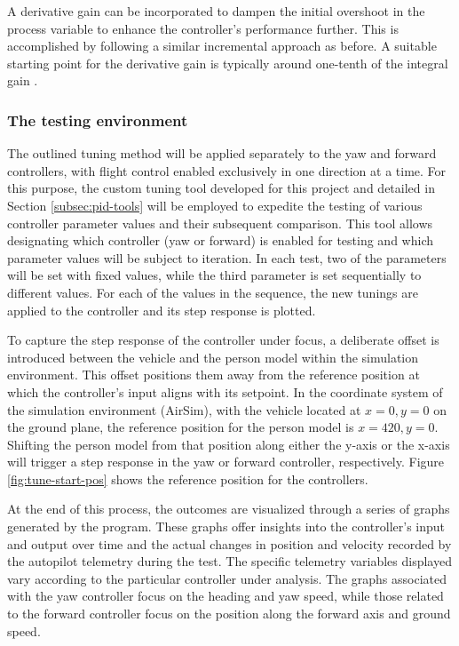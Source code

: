 A derivative gain can be incorporated to dampen the initial overshoot in the process variable to enhance the controller's performance further. This is accomplished by following a similar incremental approach as before. A suitable starting point for the derivative gain is typically around one-tenth of the integral gain \cite{pid-tuning}.


\subsubsection{The testing environment}

The outlined tuning method will be applied separately to the yaw and forward controllers, with flight control enabled exclusively in one direction at a time. For this purpose, the custom tuning tool developed for this project and detailed in Section \ref{subsec:pid-tools} will be employed to expedite the testing of various controller parameter values and their subsequent comparison. This tool allows designating which controller (yaw or forward) is enabled for testing and which parameter values will be subject to iteration. In each test, two of the parameters will be set with fixed values, while the third parameter is set sequentially to different values. For each of the values in the sequence, the new tunings are applied to the controller and its step response is plotted.

To capture the step response of the controller under focus, a deliberate offset is introduced between the vehicle and the person model within the simulation environment. This offset positions them away from the reference position at which the controller's input aligns with its setpoint. In the coordinate system of the simulation environment (AirSim), with the vehicle located at $x=0, y=0$ on the ground plane, the reference position for the person model is $x=420, y=0$. Shifting the person model from that position along either the y-axis or the x-axis will trigger a step response in the yaw or forward controller, respectively. Figure \ref{fig:tune-start-pos} shows the reference position for the controllers.

At the end of this process, the outcomes are visualized through a series of graphs generated by the program. These graphs offer insights into the controller's input and output over time and the actual changes in position and velocity recorded by the autopilot telemetry during the test. The specific telemetry variables displayed vary according to the particular controller under analysis. The graphs associated with the yaw controller focus on the heading and yaw speed, while those related to the forward controller focus on the position along the forward axis and ground speed.

